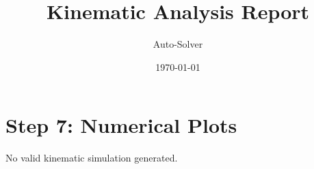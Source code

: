 \documentclass[12pt, a4paper]{article}
\title{\textbf{Kinematic Analysis Report}}
\author{Auto-Solver}
\date{\today}
\begin{document}
\maketitle
\section*{Step 7: Numerical Plots}
No valid kinematic simulation generated.
\end{document}
